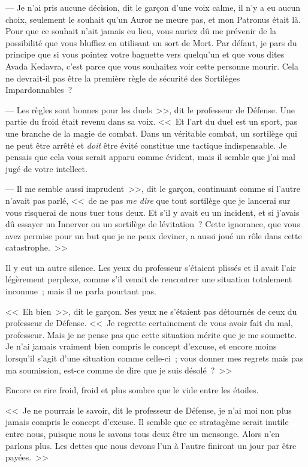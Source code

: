 --- Je n'ai pris aucune décision, dit le garçon d'une voix calme, il n'y a eu aucun choix, seulement le souhait qu'un Auror ne meure pas, et mon Patronus était là. Pour que ce souhait n'ait jamais eu lieu, vous auriez dû me prévenir de la possibilité que vous bluffiez en utilisant un sort de Mort. Par défaut, je pars du principe que si vous pointez votre baguette vers quelqu'un et que vous dites Avada Kedavra, c'est parce que vous souhaitez voir cette personne mourir. Cela ne devrait-il pas être la première règle de sécurité des Sortilèges Impardonnables~?

--- Les règles sont bonnes pour les duels~>>, dit le professeur de Défense. Une partie du froid était revenu dans sa voix. <<~Et l'art du duel est un sport, pas une branche de la magie de combat. Dans un véritable combat, un sortilège qui ne peut être arrêté et \emph{doit} être évité constitue une tactique indispensable. Je pensais que cela vous serait apparu comme évident, mais il semble que j'ai mal jugé de votre intellect.

--- Il me semble aussi imprudent~>>, dit le garçon, continuant comme si l'autre n'avait pas parlé, <<~de ne pas \emph{me dire} que tout sortilège que je lancerai sur vous risquerai de nous tuer tous deux. Et s'il y avait eu un incident, et si j'avais dû essayer un Innerver ou un sortilège de lévitation~? Cette ignorance, que vous avez permise pour un but que je ne peux deviner, a aussi joué un rôle dans cette catastrophe.~>>

Il y eut un autre silence. Les yeux du professeur s'étaient plissés et il avait l'air légèrement perplexe, comme s'il venait de rencontrer une situation totalement inconnue~; mais il ne parla pourtant pas.

<<~Eh bien~>>, dit le garçon. Ses yeux ne s'étaient pas détournés de ceux du professeur de Défense. <<~Je regrette certainement de vous avoir fait du mal, professeur. Mais je ne pense pas que cette situation mérite que je me soumette. Je n'ai jamais vraiment bien compris le concept d'excuse, et encore moins lorsqu'il s'agit d'une situation comme celle-ci~; vous donner mes regrets mais pas ma soumission, est-ce comme de dire que je suis désolé~?~>>

Encore ce rire froid, froid et plus sombre que le vide entre les étoiles.

<<~Je ne pourrais le savoir, dit le professeur de Défense, je n'ai moi non plus jamais compris le concept d'excuse. Il semble que ce stratagème serait inutile entre nous, puisque nous le savons tous deux être un mensonge. Alors n'en parlons plus. Les dettes que nous devons l'un à l'autre finiront un jour par être payées.~>>

